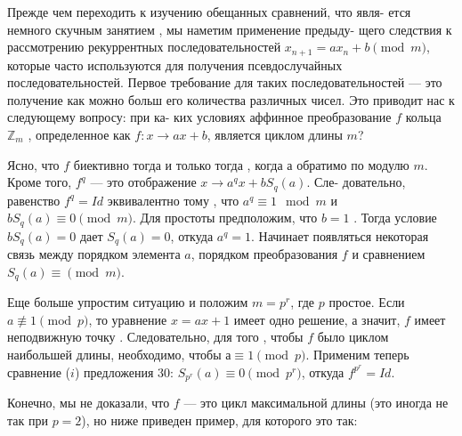 \documentclass{../template/mai_book}
\begin{document}
Прежде чем переходить к изучению обещанных сравнений, что явля­-\linebreak
ется немного скучным занятием , мы наметим применение предыду­-\linebreak
щего следствия к рассмотрению рекуррентных последовательностей\linebreak
$x_{n+1} = ax_n+b \pmod{m}$, которые часто используются для получения\linebreak
псевдослучайных последовательностей. Первое требование для таких\linebreak
последовательностей — это получение как можно больш его количества\linebreak
различных чисел. Это приводит нас к следующему вопросу: при ка-\linebreak
ких условиях аффинное преобразование $f$ кольца $\mathbb{Z}_m$ , определенное как\linebreak
$f:x\rightarrow ax+b$, является циклом длины $m$?

Ясно, что $f$ биективно тогда и только тогда , когда $а$ обратимо по\linebreak
модулю $m$. Кроме того, $f^q$ — это отображение $x \rightarrow a^qx + bS_q(a)$. Сле­-\linebreak
довательно, равенство $f^q = Id$ эквивалентно тому , что $a^q \equiv 1 \mod{m}$\linebreak
и $bS_q(a) \equiv 0 \pmod{m}$. Для простоты предположим, что $b = 1$ . Тогда\linebreak
условие $bS_q(a) = 0$ дает $S_q(a) = 0$, откуда $a^q = 1$. Начинает появляться\linebreak
некоторая связь между порядком элемента $a$, порядком преобразования\linebreak
$f$ и сравнением $S_q(a)\equiv \pmod{m}$.

Еще больше упростим ситуацию и положим $m = p^r$, где $p$ простое.\linebreak
Если $a \not\equiv 1 \pmod{p}$, то уравнение $x = ax + 1$ имеет одно решение, а\linebreak
значит, $f$ имеет неподвижную точку . Следовательно, для того , чтобы\linebreak
$f$ было циклом наибольшей длины, необходимо, чтобы $а \equiv 1 \pmod{p}$.\linebreak
Применим теперь сравнение ($i$) предложения 30: $S_{p^r}(a) \equiv 0 \pmod{p^r}$,\linebreak
откуда $f^{p^r} = Id$.

Конечно, мы не доказали, что $f$ — это цикл максимальной длины\linebreak
(это иногда не так при $p = 2$), но ниже приведен пример, для которого
это так:
\end{document}
